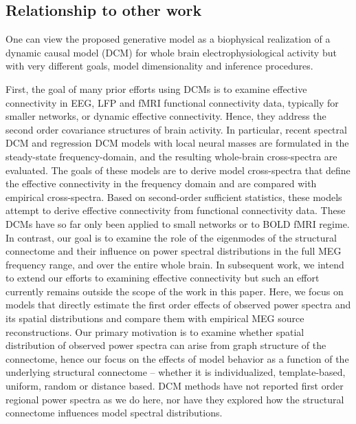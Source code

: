 \subsection{Relationship to other work}

One can view the proposed generative model as a biophysical realization
of a dynamic causal model (DCM) \cite{daunizeau_dynamic_2011,friston_dynamic_2017,pinotsis_anatomical_2013,razi_construct_2015,pinotsis_linking_2017} for whole brain electrophysiological activity but with very different goals, model
dimensionality and inference procedures.

First, the goal of many prior efforts using DCMs is to examine effective
connectivity in EEG, LFP and fMRI functional connectivity data,
typically for smaller networks\cite{pinotsis_linking_2017,daunizeau_dynamic_2009}, or dynamic
effective connectivity\cite{park_dynamic_2018,van_de_steen_dynamic_2019,preti_dynamic_2017}. Hence, they address the second order covariance structures of brain activity. In particular,
recent spectral DCM and regression DCM models \cite{razi_large-scale_2017,frassle_regression_2017,frassle_generative_2018}
with local neural masses are formulated in the steady-state
frequency-domain, and the resulting whole-brain cross-spectra are
evaluated. The goals of these models are to derive model cross-spectra
that define the effective connectivity in the frequency domain and are
compared with empirical cross-spectra. Based on second-order sufficient
statistics, these models attempt to derive effective connectivity from
functional connectivity data. These DCMs have so far only been applied
to small networks or to BOLD fMRI regime. In contrast, our goal is to
examine the role of the eigenmodes of the structural connectome and
their influence on power spectral distributions in the full MEG
frequency range, and over the entire whole brain. In subsequent work, we
intend to extend our efforts to examining effective connectivity but
such an effort currently remains outside the scope of the work in this
paper. Here, we focus on models that directly estimate the first order
effects of observed power spectra and its spatial distributions and
compare them with empirical MEG source reconstructions. Our primary
motivation is to examine whether spatial distribution of observed power
spectra can arise from graph structure of the connectome, hence our
focus on the effects of model behavior as a function of the underlying
structural connectome -- whether it is individualized, template-based,
uniform, random or distance based. DCM methods have not reported first
order regional power spectra as we do here, nor have they explored how
the structural connectome influences model spectral distributions.

